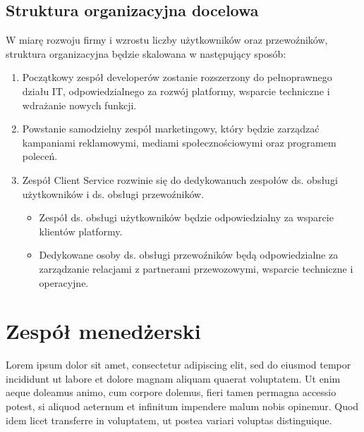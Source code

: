     \subsection {Struktura organizacyjna docelowa}
    W miarę rozwoju firmy i wzrostu liczby użytkowników oraz przewoźników, struktura organizacyjna będzie skalowana w następujący sposób:
    \begin{enumerate}
        \item Początkowy zespół developerów zostanie rozszerzony do pełnoprawnego działu IT, odpowiedzialnego za rozwój platformy, wsparcie techniczne i wdrażanie nowych funkcji.
        \item Powstanie samodzielny zespół marketingowy, który będzie zarządzać kampaniami reklamowymi, mediami społecznościowymi oraz programem poleceń.
        \item Zespół Client Service rozwinie się do dedykowanuch zespołów ds. obsługi użytkowników i ds. obsługi przewoźników. 
        \begin{itemize}
            \item Zespół ds. obsługi użytkowników będzie odpowiedzialny za wsparcie klientów platformy.
            \item Dedykowane osoby ds. obsługi przewoźników będą odpowiedzialne za zarządzanie relacjami z partnerami przewozowymi, wsparcie techniczne i operacyjne.
            \end{itemize}
    \end{enumerate}
\section{Zespół menedżerski}

Lorem ipsum dolor sit amet, consectetur adipiscing elit, sed do eiusmod tempor incididunt ut labore et dolore magnam aliquam quaerat voluptatem. Ut enim aeque doleamus animo, cum corpore dolemus, fieri tamen permagna accessio potest, si aliquod aeternum et infinitum impendere malum nobis opinemur. Quod idem licet transferre in voluptatem, ut postea variari voluptas distinguique.